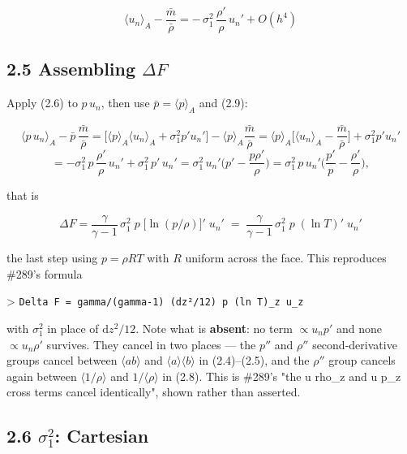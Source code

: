 \documentclass[11pt,a4paper]{article}
\begin{document}
\begin{equation*}
\boxed{\;\langle u_n\rangle_A - \frac{\bar m}{\bar\rho}
= -\,\sigma_1^2\,\frac{\rho'}{\rho}\,u_n' + O(h^4)\;}
\tag{2.9}
\end{equation*}

\subsection*{2.5 Assembling $\Delta F$}

Apply (2.6) to $p\,u_n$, then use $\bar p=\langle p\rangle_A$ and (2.9):

\begin{equation*}
\langle p\,u_n\rangle_A - \bar p\,\frac{\bar m}{\bar\rho}
= \Big[\langle p\rangle_A\langle u_n\rangle_A + \sigma_1^2 p'u_n'\Big]
  - \langle p\rangle_A\frac{\bar m}{\bar\rho}
= \langle p\rangle_A\Big[\langle u_n\rangle_A-\frac{\bar m}{\bar\rho}\Big]
  + \sigma_1^2 p'u_n'
\end{equation*}
\begin{equation*}
= -\sigma_1^2\,p\,\frac{\rho'}{\rho}\,u_n' + \sigma_1^2\,p'\,u_n'
= \sigma_1^2\,u_n'\Big(p'-\frac{p\rho'}{\rho}\Big)
= \sigma_1^2\,p\,u_n'\Big(\frac{p'}{p}-\frac{\rho'}{\rho}\Big),
\end{equation*}

that is

\begin{equation*}
\boxed{\;
\Delta F = \frac{\gamma}{\gamma-1}\,\sigma_1^2\;p\;
\big[\ln(p/\rho)\big]'\;u_n'
\;=\;\frac{\gamma}{\gamma-1}\,\sigma_1^2\;p\;(\ln T)'\;u_n'
\;}
\tag{2.10}
\end{equation*}

the last step using $p=\rho R T$ with $R$ uniform across the face. This
reproduces \#289's formula

> \texttt{Delta F = gamma/(gamma-1) (dz²/12) p (ln T)\_z u\_z}

with $\sigma_1^2$ in place of $\mathrm{d}z^2/12$. Note what is \textbf{absent}: no
term $\propto u_n p'$ and none $\propto u_n\rho'$ survives. They cancel in two
places — the $p''$ and $\rho''$ second-derivative groups cancel between
$\langle ab\rangle$ and $\langle a\rangle\langle b\rangle$ in (2.4)–(2.5), and the
$\rho''$ group cancels again between $\langle 1/\rho\rangle$ and
$1/\langle\rho\rangle$ in (2.8). This is \#289's
"the u rho\_z and u p\_z cross terms cancel identically", shown rather than
asserted.

\subsection*{2.6 $\sigma_1^2$: Cartesian}
\end{document}
